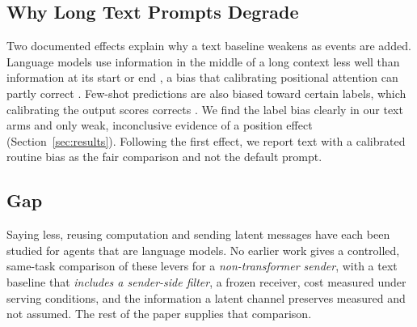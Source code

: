 \subsection{Why Long Text Prompts Degrade}
Two documented effects explain why a text baseline weakens as events are added. Language models use information in the middle of a long context less well than information at its start or end \cite{liu2024lost}, a bias that calibrating positional attention can partly correct \cite{hsieh2024found}. Few-shot predictions are also biased toward certain labels, which calibrating the output scores corrects \cite{zhao2021calibrate}. We find the label bias clearly in our text arms and only weak, inconclusive evidence of a position effect (Section~\ref{sec:results}). Following the first effect, we report text with a calibrated routine bias as the fair comparison and not the default prompt.

\subsection{Gap}
Saying less, reusing computation and sending latent messages have each been studied for agents that are language models. No earlier work gives a controlled, same-task comparison of these levers for a \emph{non-transformer sender}, with a text baseline that \emph{includes a sender-side filter}, a frozen receiver, cost measured under serving conditions, and the information a latent channel preserves measured and not assumed. The rest of the paper supplies that comparison.
